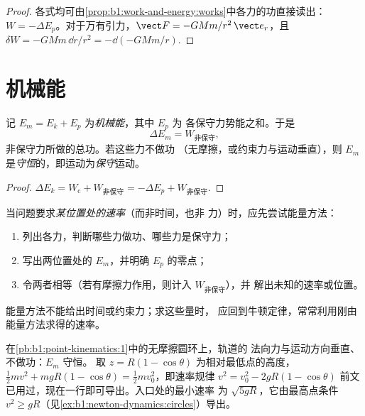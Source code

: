 \begin{proof}
各式均可由\cref{prop:b1:work-and-energy:works}中各力的功直接读出：
$W = -\Delta E_p$。对于万有引力，$\vect F = -GMm/r^2\,\vect e_r$，且
$\delta W = -GMm\,\dd r/r^2 = -\dd(-GMm/r)$.
\end{proof}

\section{机械能}

\begin{theorem}[机械能]\label{thm:b1:work-and-energy:em}
记 $E_m = E_k + E_p$ 为\emph{机械能}，其中 $E_p$ 为
各保守力势能之和。于是
\[
\Delta E_m = W_{\text{非保守}} ,
\]
非保守力所做的总功。若这些力不做功
（无摩擦，或约束力与运动垂直），则 $E_m$
是\emph{守恒}的，即运动为\emph{保守}运动。
\end{theorem}

\begin{proof}
$\Delta E_k = W_{\text{c}} + W_{\text{非保守}} = -\Delta E_p + W_{\text{非保守}}$.
\end{proof}

\begin{method}[用能量求解]\label{met:b1:work-and-energy:method}
当问题要求\emph{某位置处的速率}（而非时间，也非
力）时，应先尝试能量方法：
\begin{enumerate}
  \item 列出各力，判断哪些力做功、哪些力是保守力；
  \item 写出两位置处的 $E_m$，并明确 $E_p$ 的零点；
        \item 令两者相等（若有摩擦力作用，则计入 $W_{\text{非保守}}$），并
        解出未知的速率或位置。
\end{enumerate}
能量方法不能给出时间或约束力；求这些量时，
应回到牛顿定律，常常利用刚由能量方法求得的速率。
\end{method}

\begin{example}[圆环轨道的速率规律]\label{ex:b1:work-and-energy:loop}
在\cref{pb:b1:point-kinematics:1}中的无摩擦圆环上，轨道的
法向力与运动方向垂直、不做功：$E_m$ 守恒。
取 $z = R(1 - \cos\theta)$ 为相对最低点的高度，$\tfrac12 mv^2 + mgR(1 -
\cos\theta) = \tfrac12 mv_0^2$，即速率规律 $v^2 = v_0^2 - 2gR(1 -
\cos\theta)$ 前文已用过，现在一行即可导出。入口处的最小速率
为 $\sqrt{5gR}$，它由最高点条件
$v^2 \geq gR$（见\cref{ex:b1:newton-dynamics:circles}）导出。
\end{example}

